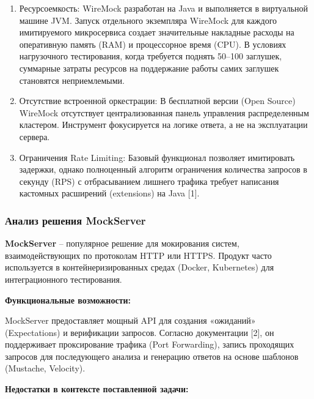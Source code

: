 \documentclass[
]{article}
\begin{document}
\begin{enumerate}
\def\labelenumi{\arabic{enumi}.}
\item
  Ресурсоемкость: WireMock разработан на Java и выполняется в
  виртуальной машине JVM. Запуск отдельного экземпляра WireMock для
  каждого имитируемого микросервиса создает значительные накладные
  расходы на оперативную память (RAM) и процессорное время (CPU). В
  условиях нагрузочного тестирования, когда требуется поднять 50--100
  заглушек, суммарные затраты ресурсов на поддержание работы самих
  заглушек становятся неприемлемыми.
\item
  Отсутствие встроенной оркестрации: В бесплатной версии (Open Source)
  WireMock отсутствует централизованная панель управления распределенным
  кластером. Инструмент фокусируется на логике ответа, а не на
  эксплуатации сервера.
\item
  Ограничения Rate Limiting: Базовый функционал позволяет имитировать
  задержки, однако полноценный алгоритм ограничения количества запросов
  в секунду (RPS) с отбрасыванием лишнего трафика требует написания
  кастомных расширений (extensions) на Java {[}1{]}.
\end{enumerate}

\subsubsection{Анализ решения
MockServer}\label{ux430ux43dux430ux43bux438ux437-ux440ux435ux448ux435ux43dux438ux44f-mockserver}

\textbf{MockServer} -- популярное решение для мокирования систем,
взаимодействующих по протоколам HTTP или HTTPS. Продукт часто
используется в контейнеризированных средах (Docker, Kubernetes) для
интеграционного тестирования.

\textbf{Функциональные возможности:}

MockServer предоставляет мощный API для создания «ожиданий»
(Expectations) и верификации запросов. Согласно документации {[}2{]}, он
поддерживает проксирование трафика (Port Forwarding), запись проходящих
запросов для последующего анализа и генерацию ответов на основе шаблонов
(Mustache, Velocity).

\textbf{Недостатки в контексте поставленной задачи:}
\end{document}
